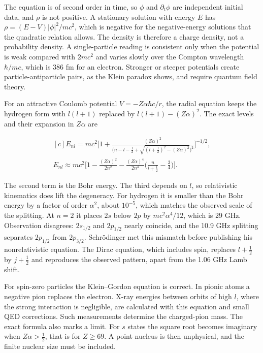 \documentclass[11pt,oneside]{book}
\newenvironment{centeredalign}{\[\begin{gathered}[c]}{\end{gathered}\]}
\begin{document}
The equation is of second order in time, so \(\phi\) and \(\partial_t\phi\) are independent initial data, and \(\rho\) is not positive. A stationary solution with energy \(E\) has \(\rho=(E-V)|\phi|^2/mc^2\), which is negative for the negative-energy solutions that the quadratic relation allows. The density is therefore a charge density, not a probability density. A single-particle reading is consistent only when the potential is weak compared with \(2mc^2\) and varies slowly over the Compton wavelength \(\hbar/mc\), which is 386 fm for an electron. Stronger or steeper potentials create particle-antiparticle pairs, as the Klein paradox shows, and require quantum field theory.

For an attractive Coulomb potential \(V=-Z\alpha\hbar c/r\), the radial equation keeps the hydrogen form with \(l(l+1)\) replaced by \(l(l+1)-(Z\alpha)^2\). The exact levels and their expansion in \(Z\alpha\) are

\begin{centeredalign}
E_{nl}=mc^2\Big[1+\frac{(Z\alpha)^2}
{\big(n-l-\frac12+\sqrt{(l+\frac12)^2-(Z\alpha)^2}\big)^2}\Big]^{-1/2},\\
E_{nl}\approx mc^2\Big[1-\frac{(Z\alpha)^2}{2n^2}
-\frac{(Z\alpha)^4}{2n^4}\Big(\frac{n}{l+\frac12}-\frac34\Big)\Big].
\end{centeredalign}

The second term is the Bohr energy. The third depends on \(l\), so relativistic kinematics does lift the degeneracy. For hydrogen it is smaller than the Bohr energy by a factor of order \(\alpha^2\), about \(10^{-5}\), which matches the observed scale of the splitting. At \(n=2\) it places \(2s\) below \(2p\) by \(mc^2\alpha^4/12\), which is 29 GHz. Observation disagrees: \(2s_{1/2}\) and \(2p_{1/2}\) nearly coincide, and the 10.9 GHz splitting separates \(2p_{1/2}\) from \(2p_{3/2}\). Schrödinger met this mismatch before publishing his nonrelativistic equation. The Dirac equation, which includes spin, replaces \(l+\frac12\) by \(j+\frac12\) and reproduces the observed pattern, apart from the 1.06 GHz Lamb shift.

For spin-zero particles the Klein--Gordon equation is correct. In pionic atoms a negative pion replaces the electron. X-ray energies between orbits of high \(l\), where the strong interaction is negligible, are calculated with this equation and small QED corrections. Such measurements determine the charged-pion mass. The exact formula also marks a limit. For \(s\) states the square root becomes imaginary when \(Z\alpha>\frac12\), that is for \(Z\geq69\). A point nucleus is then unphysical, and the finite nuclear size must be included.
\end{document}
